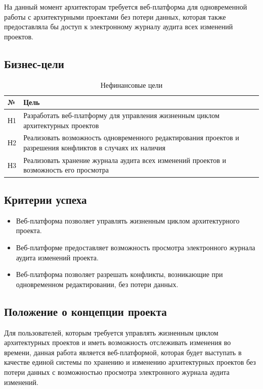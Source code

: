 \documentclass[a4paper,14pt]{extreport} %
\begin{document}
На данный момент архитекторам требуется веб-платформа для одновременной работы с архитектурными проектами без потери данных, которая также предоставляла бы доступ к электронному журналу аудита всех изменений проектов.

\newpage
\subsection{Бизнес-цели}

\begin{table}[H]
\caption {Нефинансовые цели} \label{tab:title}
\begin{center}
\begin{tabular}{ | l | p{14cm} | }
\hline
№ & Цель \\
\hline
Н1 & Разработать веб-платформу для управления жизненным циклом	архитектурных проектов \\
\hline
Н2 & Реализовать возможность одновременного редактирования проектов и разрешения конфликтов в случаях их наличия \\
\hline
Н3 & Реализовать хранение журнала аудита всех изменений проектов и возможность его просмотра \\
\hline
\end{tabular}
\end{center}
\end{table}
 
\subsection{Критерии успеха}

\begin{itemize}
\item Веб-платформа позволяет управлять жизненным циклом архитектурного проекта.
\item Веб-платформе предоставляет возможность просмотра электронного журнала аудита изменений проекта.
\item Веб-платформа позволяет разрешать конфликты, возникающие при одновременном редактировании, без потери данных.
\end {itemize}
 
 \subsection{Положение о концепции проекта}
 
Для пользователей, которым требуется управлять жизненным циклом  архитектурных проектов и иметь возможность отслеживать изменения  во времени, данная работа является веб-платформой, которая будет выступать в качестве единой системы по хранению и изменению архитектурных проектов без потери данных с возможностью просмотра электронного журнала аудита изменений.
\end{document}

